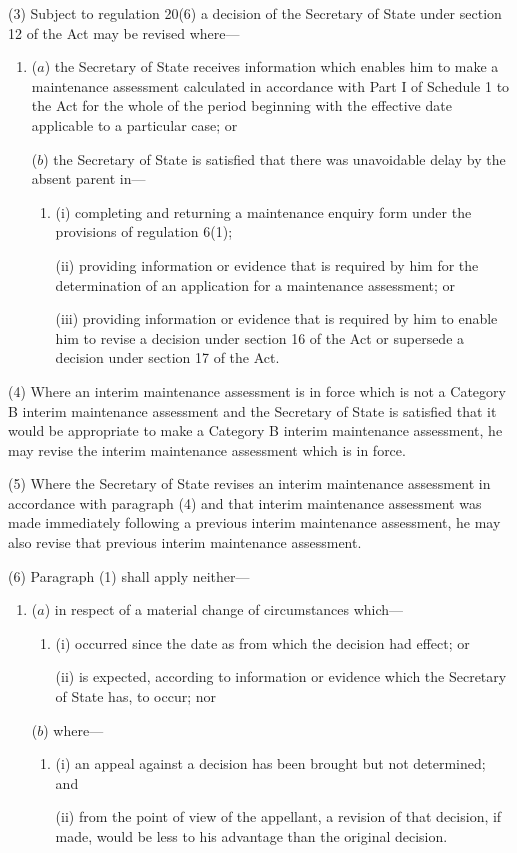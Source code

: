 \documentclass[a4paper,12pt]{article}
\begin{document}
(3) Subject to regulation 20(6) a decision of the Secretary of State under section 12 of the Act may be revised where---
\begin{enumerate}\item[]
($a$) the Secretary of State receives information which enables him to make a maintenance assessment calculated in accordance with Part I of Schedule 1 to the Act for the whole of the period beginning with the effective date applicable to a particular case; or

($b$) the Secretary of State is satisfied that there was unavoidable delay by the absent parent in---
\begin{enumerate}\item[]
(i) completing and returning a maintenance enquiry form under the provisions of regulation 6(1);

(ii) providing information or evidence that is required by him for the determination of an application for a maintenance assessment; or

(iii) providing information or evidence that is required by him to enable him to revise a decision under section 16 of the Act or supersede a decision under section 17 of the Act.
\end{enumerate}
\end{enumerate}

(4) Where an interim maintenance assessment is in force which is not a Category B interim maintenance assessment and the Secretary of State is satisfied that it would be appropriate to make a Category B interim maintenance assessment, he may revise the interim maintenance assessment which is in force.

(5) Where the Secretary of State revises an interim maintenance assessment in accordance with paragraph (4) and that interim maintenance assessment was made immediately following a previous interim maintenance assessment, he may also revise that previous interim maintenance assessment.

(6) Paragraph (1) shall apply neither---
\begin{enumerate}\item[]
\begin{sloppypar}
($a$) in respect of a material change of circumstances which—
\end{sloppypar}
\begin{enumerate}\item[]
(i) occurred since the date as from which the decision had effect; or

(ii) is expected, according to information or evidence which the Secretary of State has, to occur; nor
\end{enumerate}

($b$) where---
\begin{enumerate}\item[]
(i) an appeal against a decision has been brought but not determined; and

(ii) from the point of view of the appellant, a revision of that decision, if made, would be less to his advantage than the original decision.
\end{enumerate}
\end{enumerate}
\end{document}
